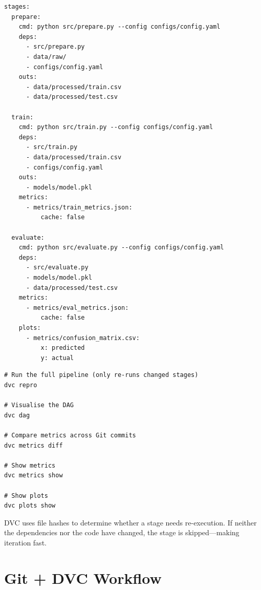 \begin{codeblock}[title=\textbf{dvc.yaml --- Complete ML pipeline}]
\begin{verbatim}
stages:
  prepare:
    cmd: python src/prepare.py --config configs/config.yaml
    deps:
      - src/prepare.py
      - data/raw/
      - configs/config.yaml
    outs:
      - data/processed/train.csv
      - data/processed/test.csv

  train:
    cmd: python src/train.py --config configs/config.yaml
    deps:
      - src/train.py
      - data/processed/train.csv
      - configs/config.yaml
    outs:
      - models/model.pkl
    metrics:
      - metrics/train_metrics.json:
          cache: false

  evaluate:
    cmd: python src/evaluate.py --config configs/config.yaml
    deps:
      - src/evaluate.py
      - models/model.pkl
      - data/processed/test.csv
    metrics:
      - metrics/eval_metrics.json:
          cache: false
    plots:
      - metrics/confusion_matrix.csv:
          x: predicted
          y: actual
\end{verbatim}
\end{codeblock}

\begin{codeblock}[title=\textbf{Running and inspecting DVC pipelines}]
\begin{verbatim}
# Run the full pipeline (only re-runs changed stages)
dvc repro

# Visualise the DAG
dvc dag

# Compare metrics across Git commits
dvc metrics diff

# Show metrics
dvc metrics show

# Show plots
dvc plots show
\end{verbatim}
\end{codeblock}

\begin{remark}
DVC uses file hashes to determine whether a stage needs re-execution.
If neither the dependencies nor the code have changed, the stage is
skipped---making iteration fast.
\end{remark}

\section{Git + DVC Workflow}
\label{sec:git-dvc-workflow}

